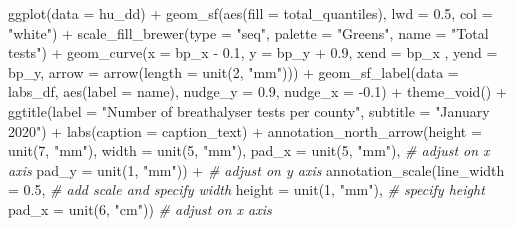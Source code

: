 \documentclass[
]{book}
\makeatletter
\newenvironment{Shaded}{\begin{snugshade}}{\end{snugshade}}
\newcommand{\AttributeTok}[1]{\textcolor[rgb]{0.61,0.61,0.61}{#1}}
\newcommand{\CommentTok}[1]{\textcolor[rgb]{0.37,0.37,0.37}{\textit{#1}}}
\newcommand{\DecValTok}[1]{\textcolor[rgb]{0.06,0.06,0.06}{#1}}
\newcommand{\FloatTok}[1]{\textcolor[rgb]{0.06,0.06,0.06}{#1}}
\newcommand{\FunctionTok}[1]{\textcolor[rgb]{0,0,0}{#1}}
\newcommand{\NormalTok}[1]{#1}
\newcommand{\SpecialCharTok}[1]{\textcolor[rgb]{0,0,0}{#1}}
\newcommand{\StringTok}[1]{\textcolor[rgb]{0.5,0.5,0.5}{#1}}
\newenvironment{kframe}{%
\medskip{}
\setlength{\fboxsep}{.8em}
 \def\at@end@of@kframe{}%
 \ifinner\ifhmode%
  \def\at@end@of@kframe{\end{minipage}}%
  \begin{minipage}{\columnwidth}%
 \fi\fi%
 \def\FrameCommand##1{\hskip\@totalleftmargin \hskip-\fboxsep
 \colorbox{shadecolor}{##1}\hskip-\fboxsep
     \hskip-\linewidth \hskip-\@totalleftmargin \hskip\columnwidth}%
 \MakeFramed {\advance\hsize-\width
   \@totalleftmargin\z@ \linewidth\hsize
   \@setminipage}}%
 {\par\unskip\endMakeFramed%
 \at@end@of@kframe}
\renewenvironment{Shaded}{\begin{kframe}}{\end{kframe}}
\makeatother
\begin{document}
\begin{Shaded}
\begin{Highlighting}[]
\FunctionTok{ggplot}\NormalTok{(}\AttributeTok{data =}\NormalTok{ hu\_dd) }\SpecialCharTok{+} 
  \FunctionTok{geom\_sf}\NormalTok{(}\FunctionTok{aes}\NormalTok{(}\AttributeTok{fill =}\NormalTok{ total\_quantiles), }
          \AttributeTok{lwd =} \FloatTok{0.5}\NormalTok{, }\AttributeTok{col =} \StringTok{"white"}\NormalTok{) }\SpecialCharTok{+} 
  \FunctionTok{scale\_fill\_brewer}\NormalTok{(}\AttributeTok{type =} \StringTok{"seq"}\NormalTok{, }
                    \AttributeTok{palette =} \StringTok{"Greens"}\NormalTok{, }
                    \AttributeTok{name =} \StringTok{"Total tests"}\NormalTok{) }\SpecialCharTok{+} 
  \FunctionTok{geom\_curve}\NormalTok{(}\AttributeTok{x =}\NormalTok{ bp\_x }\SpecialCharTok{{-}} \FloatTok{0.1}\NormalTok{, }
             \AttributeTok{y =}\NormalTok{ bp\_y }\SpecialCharTok{+} \FloatTok{0.9}\NormalTok{, }
             \AttributeTok{xend =}\NormalTok{ bp\_x , }
             \AttributeTok{yend =}\NormalTok{ bp\_y, }
             \AttributeTok{arrow =} \FunctionTok{arrow}\NormalTok{(}\AttributeTok{length =} \FunctionTok{unit}\NormalTok{(}\DecValTok{2}\NormalTok{, }\StringTok{"mm"}\NormalTok{))) }\SpecialCharTok{+}
  \FunctionTok{geom\_sf\_label}\NormalTok{(}\AttributeTok{data =}\NormalTok{ labs\_df, }
                \FunctionTok{aes}\NormalTok{(}\AttributeTok{label =}\NormalTok{ name), }
                \AttributeTok{nudge\_y =} \FloatTok{0.9}\NormalTok{, }
                \AttributeTok{nudge\_x =} \SpecialCharTok{{-}}\FloatTok{0.1}\NormalTok{) }\SpecialCharTok{+} 
  \FunctionTok{theme\_void}\NormalTok{() }\SpecialCharTok{+} 
  \FunctionTok{ggtitle}\NormalTok{(}\AttributeTok{label =} \StringTok{"Number of breathalyser tests per county"}\NormalTok{, }
          \AttributeTok{subtitle =} \StringTok{"January 2020"}\NormalTok{) }\SpecialCharTok{+} 
  \FunctionTok{labs}\NormalTok{(}\AttributeTok{caption =}\NormalTok{ caption\_text) }\SpecialCharTok{+} 
  \FunctionTok{annotation\_north\_arrow}\NormalTok{(}\AttributeTok{height =} \FunctionTok{unit}\NormalTok{(}\DecValTok{7}\NormalTok{, }\StringTok{"mm"}\NormalTok{), }
                         \AttributeTok{width =} \FunctionTok{unit}\NormalTok{(}\DecValTok{5}\NormalTok{, }\StringTok{"mm"}\NormalTok{), }
                         \AttributeTok{pad\_x =} \FunctionTok{unit}\NormalTok{(}\DecValTok{5}\NormalTok{, }\StringTok{"mm"}\NormalTok{),   }\CommentTok{\# adjust on x axis}
                         \AttributeTok{pad\_y =} \FunctionTok{unit}\NormalTok{(}\DecValTok{1}\NormalTok{, }\StringTok{"mm"}\NormalTok{)) }\SpecialCharTok{+} \CommentTok{\# adjust on y axis}
  \FunctionTok{annotation\_scale}\NormalTok{(}\AttributeTok{line\_width =} \FloatTok{0.5}\NormalTok{,      }\CommentTok{\# add scale and specify width}
                   \AttributeTok{height =} \FunctionTok{unit}\NormalTok{(}\DecValTok{1}\NormalTok{, }\StringTok{"mm"}\NormalTok{), }\CommentTok{\# specify height}
                   \AttributeTok{pad\_x =} \FunctionTok{unit}\NormalTok{(}\DecValTok{6}\NormalTok{, }\StringTok{"cm"}\NormalTok{))  }\CommentTok{\# adjust on x axis}
\end{Highlighting}
\end{Shaded}
\end{document}

